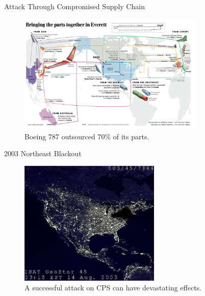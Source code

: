 \documentclass[10pt]{beamer}
\begin{document}
\begin{frame}{Attack Through Compromised Supply Chain}
  \begin{figure}[ht]
    \centering
    \includegraphics[width=0.8\textwidth]{boeing.jpg}
    \caption{Boeing 787 outsourced 70\% of its parts.}
  \end{figure}
\end{frame}

\begin{frame}{2003 Northeast Blackout}
  \begin{figure}[<+htpb+>]
    \begin{center}
      \includegraphics[width=0.60\textwidth]{blackout.jpg}
      \caption{A successful attack on CPS can have devastating effects.}
    \end{center}
  \end{figure}
\end{frame}

%
\end{document}
